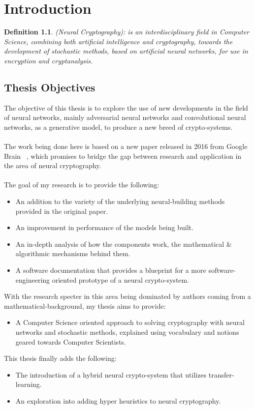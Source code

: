 \documentclass[a4paper, 12pt]{report}
\newtheorem{definition}{Definition}
\begin{document}
\chapter{Introduction}\label{sec:introduction}
\begin{definition}
	(Neural Cryptography): is an interdisciplinary field in Computer Science, combining both artificial intelligence and cryptography, towards the development of stochastic methods, based on artificial neural networks, for use in encryption and cryptanalysis.
\end{definition}
\section{\textbf{Thesis Objectives}}
The objective of this thesis is to explore the use of new developments in the field of neural networks, mainly adversarial neural networks and convolutional neural networks, as a generative model, to produce a new breed of crypto-systems.\\\\
The work being done here is based on a new paper released in 2016 from Google Brain ~\citep{DBLP:journals/corr/AbadiA16}, which promises to bridge the gap between research and application in the area of neural cryptography.\\\\
The goal of my research is to provide the following:
\begin{itemize}
	\item An addition to the variety of the underlying neural-building methods provided in the original paper.
	\item An improvement in performance of the models being built.
	\item An in-depth analysis of how the components work, the mathematical \&  algorithmic mechanisms behind them.
	\item A software documentation that provides a blueprint for a more software-engineering oriented prototype of a neural crypto-system.
\end{itemize}
With the research specter in this area being dominated by authors coming from a mathematical-background, my thesis aims to provide:
\begin{itemize}
	\item A Computer Science oriented approach to solving cryptography with neural networks and stochastic methods, explained using vocabulary and notions geared towards Computer Scientists.
\end{itemize}
This thesis finally adds the following:
\begin{itemize}
	\item The introduction of a hybrid neural crypto-system that utilizes transfer-learning.\citep{5288526}
	\item An exploration into adding hyper heuristics to neural cryptography.
\end{itemize}
\newpage
\end{document}
